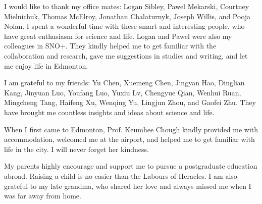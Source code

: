I would like to thank my office mates: Logan Sibley, Pawel Mekarski, Courtney Mielnichuk, Thomas McElroy, Jonathan Chalaturnyk, Joseph Willis, and Pooja Nolan. I spent a wonderful time with these smart and interesting people, who have great enthusiasm for science and life. Logan and Pawel were also my colleagues in SNO+. They kindly helped me to get familiar with the collaboration and research, gave me suggestions in studies and writing, and let me enjoy life in Edmonton.

I am grateful to my friends: Yu Chen, Xuemeng Chen, Jingyan Hao, Dinglian Kang, Jinyuan Luo, Youfang Luo, Yuxiu Lv, Chengyue Qian, Wenhui Ruan, Mingcheng Tang, Haifeng Xu, Wenqing Yu, Lingjun Zhou, and Gaofei Zhu. They have brought me countless insights and ideas about science and life.

When I first came to Edmonton, Prof. Keumhee Chough kindly provided me with accommodation, welcomed me at the airport, and helped me to get familiar with life in the city. I will never forget her kindness.

My parents highly encourage and support me to pursue a postgraduate education abroad. Raising a child is no easier than the Labours of Heracles. I am also grateful to my late grandma, who shared her love and always missed me when I was far away from home.
